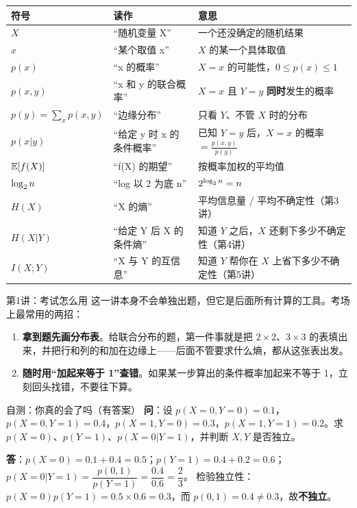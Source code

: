 \begin{center}
\renewcommand{\arraystretch}{1.45}
\begin{tabular}{l|l|l}
\toprule
符号 & 读作 & 意思\\
\midrule
$X$ & “随机变量 X” & 一个还没确定的随机结果\\
$x$ & “某个取值 x” & $X$ 的某一个具体取值\\
$p(x)$ & “x 的概率” & $X=x$ 的可能性，$0\le p(x)\le1$\\
$p(x,y)$ & “x 和 y 的联合概率” & $X=x$ 且 $Y=y$ \textbf{同时}发生的概率\\
$p(y)=\sum_x p(x,y)$ & “边缘分布” & 只看 $Y$、不管 $X$ 时的分布\\
$p(x|y)$ & “给定 y 时 x 的条件概率” & 已知 $Y=y$ 后，$X=x$ 的概率 $=\frac{p(x,y)}{p(y)}$\\
$\operatorname{\mathbb{E}}[f(X)]$ & “f(X) 的期望” & 按概率加权的平均值\\
$\log_{2} n$ & “log 以 2 为底 n” & $2^{\log_{2} n}=n$\\
$H(X)$ & “X 的熵” & 平均信息量 / 平均不确定性（第3讲）\\
$H(X|Y)$ & “给定 Y 后 X 的条件熵” & 知道 $Y$ 之后，$X$ 还剩下多少不确定性（第4讲）\\
$I(X;Y)$ & “X 与 Y 的互信息” & 知道 $Y$ 帮你在 $X$ 上省下多少不确定性（第5讲）\\
\bottomrule
\end{tabular}
\end{center}

\begin{exam}{第1讲：考试怎么用}
这一讲本身不会单独出题，但它是后面所有计算的工具。考场上最常用的两招：
\begin{enumerate}[leftmargin=1.6em,itemsep=1pt,topsep=2pt]
  \item \textbf{拿到题先画分布表}。给联合分布的题，第一件事就是把 $2\times2$、$3\times3$ 的表填出来，并把行和列的和加在边缘上——后面不管要求什么熵，都从这张表出发。
  \item \textbf{随时用“加起来等于 1”查错}。如果某一步算出的条件概率加起来不等于 1，立刻回头找错，不要往下算。
\end{enumerate}
\end{exam}

\begin{qa}{自测：你真的会了吗（有答案）}
\textbf{问}：设 $p(X=0,Y=0)=0.1$，$p(X=0,Y=1)=0.4$，$p(X=1,Y=0)=0.3$，$p(X=1,Y=1)=0.2$。求 $p(X=0)$、$p(Y=1)$、$p(X=0|Y=1)$，并判断 $X,Y$ 是否独立。

\textbf{答}：$p(X=0)=0.1+0.4=0.5$；$p(Y=1)=0.4+0.2=0.6$；
$p(X=0|Y=1)=\dfrac{p(0,1)}{p(Y=1)}=\dfrac{0.4}{0.6}=\dfrac23$。
检验独立性：$p(X=0)p(Y=1)=0.5\times0.6=0.3$，而 $p(0,1)=0.4\ne0.3$，故\textbf{不独立}。
\end{qa}
